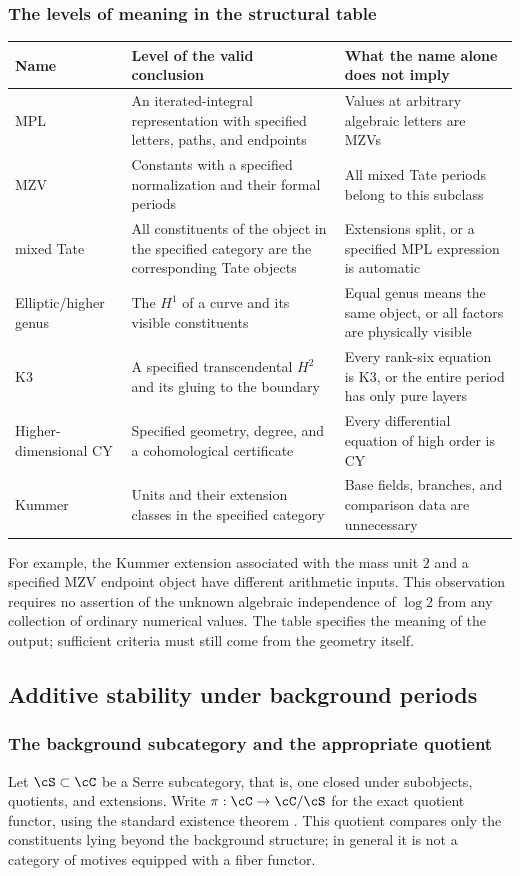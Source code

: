 \documentclass[11pt,a4paper,oneside]{article}
\theoremstyle{plain}
\theoremstyle{definition}
\theoremstyle{remark}
\numberwithin{equation}{section}
\begin{document}
\subsubsection{The levels of meaning in the structural table}
\begin{center}\small
\begin{tabular}{p{24mm}p{47mm}p{72mm}}
\toprule Name&Level of the valid conclusion&What the name alone does not imply\\\midrule
MPL&An iterated-integral representation with specified letters, paths, and endpoints&Values at arbitrary algebraic letters are MZVs\\
MZV&Constants with a specified normalization and their formal periods&All mixed Tate periods belong to this subclass\\
mixed Tate&All constituents of the object in the specified category are the corresponding Tate objects&Extensions split, or a specified MPL expression is automatic\\
Elliptic/higher genus&The $H^1$ of a curve and its visible constituents&Equal genus means the same object, or all factors are physically visible\\
K3&A specified transcendental $H^2$ and its gluing to the boundary&Every rank-six equation is K3, or the entire period has only pure layers\\
Higher-dimensional CY&Specified geometry, degree, and a cohomological certificate&Every differential equation of high order is CY\\
Kummer&Units and their extension classes in the specified category&Base fields, branches, and comparison data are unnecessary\\\bottomrule
\end{tabular}
\end{center}
For example, the Kummer extension associated with the mass unit $2$ and a specified MZV endpoint object have different arithmetic inputs.
This observation requires no assertion of the unknown algebraic independence of $\log2$ from any collection of ordinary numerical values.
The table specifies the meaning of the output; sufficient criteria must still come from the geometry itself.


\subsection{Additive stability under background periods}
\subsubsection{The background subcategory and the appropriate quotient}
Let $\cS\subset\cC$ be a Serre subcategory, that is, one closed under subobjects, quotients, and extensions.
Write $\pi:\cC\to\cC/\cS$ for the exact quotient functor, using the standard existence theorem
\cite[Tag 02MS]{stacks}. This quotient compares only the constituents lying beyond the background structure;
in general it is not a category of motives equipped with a fiber functor.
\end{document}
